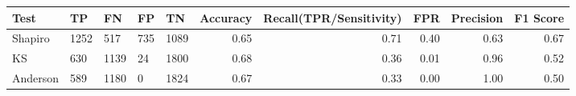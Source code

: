 \begin{tabular}{lllllrrrrr}
\toprule
Test & TP & FN & FP & TN & Accuracy & Recall(TPR/Sensitivity) & FPR & Precision & F1 Score \\
\midrule
Shapiro & 1252 & 517 & 735 & 1089 & 0.65 & 0.71 & 0.40 & 0.63 & 0.67 \\
KS & 630 & 1139 & 24 & 1800 & 0.68 & 0.36 & 0.01 & 0.96 & 0.52 \\
Anderson & 589 & 1180 & 0 & 1824 & 0.67 & 0.33 & 0.00 & 1.00 & 0.50 \\
\bottomrule
\end{tabular}
